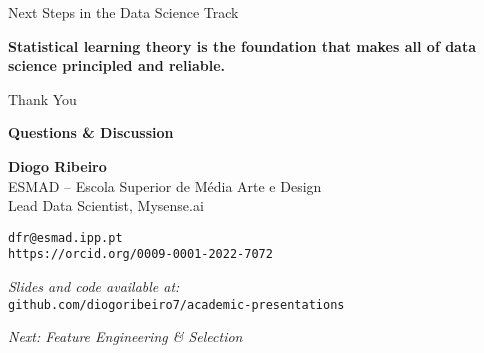 \documentclass[aspectratio=169,11pt]{beamer}
\begin{document}
\begin{frame}{Next Steps in the Data Science Track}
\vspace{0.5cm}
\begin{center}
\textcolor{navyblue}{\Large \textbf{Statistical learning theory is the foundation that makes all of data science principled and reliable.}}
\end{center}
\end{frame}

\begin{frame}
\begin{center}
{\Huge Thank You}

\vspace{0.8cm}

\textbf{Questions \& Discussion}

\vspace{1cm}

\textbf{Diogo Ribeiro}\\
ESMAD -- Escola Superior de Média Arte e Design\\
Lead Data Scientist, Mysense.ai\\

\vspace{0.5cm}

\texttt{dfr@esmad.ipp.pt}\\
\texttt{https://orcid.org/0009-0001-2022-7072}

\vspace{0.8cm}

\textit{Slides and code available at:}\\
\texttt{github.com/diogoribeiro7/academic-presentations}

\vspace{0.5cm}

\textit{Next: Feature Engineering \& Selection}
\end{center}
\end{frame}
\end{document}
